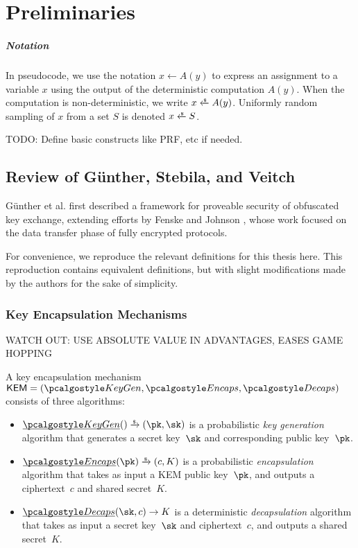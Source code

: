 \chapter{Preliminaries}\label{ch:preliminaries}

\paragraph{Notation}
In pseudocode, we use the notation $x \gets A(y)$ to express an assignment to a variable $x$ using the output of the deterministic computation $A(y)$. When the computation is non-deterministic, we write $x \getsr A(y)$.
Uniformly random sampling of $x$ from a set $S$ is denoted $x \getsr S$.

TODO: Define basic constructs like PRF, etc if needed.

\section{\texorpdfstring{Review of Günther, Stebila, and Veitch \cite{CCS:GunSteVei24}}{Review of Günther, Stebila, and Veitch}} \label{sec:review-gsv24}

Günther et al. first described a framework for proveable security of obfuscated key exchange, extending efforts by Fenske and Johnson \cite{CCS:FenJoh24}, whose work focused on the data transfer phase of fully encrypted protocols.

For convenience, we reproduce the relevant definitions for this thesis here. This reproduction contains equivalent definitions, but with slight modifications made by the authors for the sake of simplicity.

\subsection{Key Encapsulation Mechanisms}

WATCH OUT: USE ABSOLUTE VALUE IN ADVANTAGES, EASES GAME HOPPING

\begin{definition}
    \label{def:kem}
    A key encapsulation mechanism $\KEM = (\kgen, \encaps, \decaps)$ consists of three algorithms:
    \begin{itemize}
        \item $\ul{\kgen}() \tor (\pk, \sk)$
        is a probabilistic \emph{key generation} algorithm that generates a secret key~$\sk$ and corresponding public key~$\pk$.
        \item $\ul{\encaps}(\pk) \tor (c, K)$
        is a probabilistic \emph{encapsulation} algorithm that takes as input a KEM public key~$\pk$, and outputs a ciphertext~$c$ and shared secret~$K$.
        \item $\ul{\decaps}(\sk, c) \to K$
        is a deterministic \emph{decapsulation} algorithm that takes as input a secret key~$\sk$ and ciphertext~$c$, and outputs a shared secret~$K$.
    \end{itemize}
\end{definition}

